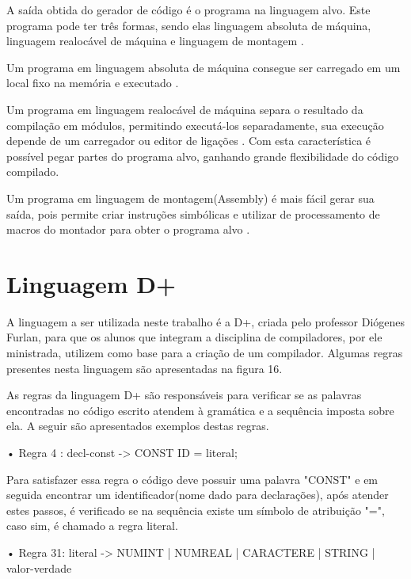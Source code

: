 \documentclass[12pt,oneside,a4paper,chapter=TITLE,section=TITLE,sumario=tradicional]{abntex2}
\begin{document}
A saída obtida do gerador de código é o programa na linguagem alvo. Este programa pode ter três formas, sendo elas linguagem absoluta de máquina, linguagem realocável de máquina e linguagem de montagem \cite{alfred1995}.

Um programa em linguagem absoluta de máquina consegue ser carregado em um local fixo na memória e executado \cite{alfred1995}.

Um programa em linguagem realocável de máquina separa o resultado da compilação em módulos, permitindo executá-los separadamente, sua execução depende de um carregador ou editor de ligações \cite{alfred1995}. Com esta característica é possível pegar partes do programa alvo, ganhando grande flexibilidade do código compilado.

Um programa em linguagem de montagem(Assembly) é mais fácil gerar sua saída, pois permite criar instruções simbólicas e utilizar de processamento de macros do montador para obter o programa alvo \cite{alfred1995}.

\section{Linguagem D+}
\label{sec:linguagem-d+}

A linguagem a ser utilizada neste trabalho é a D+, criada pelo professor Diógenes Furlan, para que os alunos que integram a disciplina de compiladores, por ele ministrada, utilizem como base para a criação de um compilador. Algumas regras presentes nesta linguagem são apresentadas na figura 16.

\begin{figure}[htb]
\end{figure}

As regras da linguagem D+ são responsáveis para verificar se as palavras encontradas no código escrito atendem à gramática e a sequência imposta sobre ela. A seguir são apresentados exemplos destas regras.

•	Regra 4 : decl-const -> CONST ID = literal;

Para satisfazer essa regra o código deve possuir uma palavra "CONST" e em seguida encontrar um identificador(nome dado para declarações), após atender estes passos, é verificado se na sequência existe um símbolo de atribuição "=", caso sim, é chamado a regra literal.

•	Regra 31: literal -> NUMINT | NUMREAL | CARACTERE | STRING | valor-verdade
\end{document}
